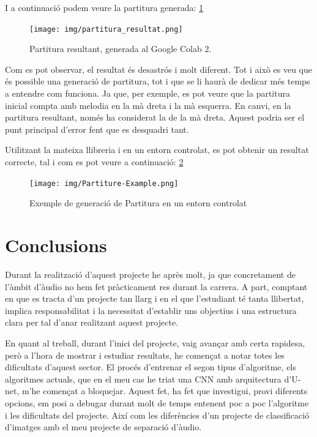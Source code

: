 \documentclass[10pt,a4paper,twocolumn,twoside]{article}
\begin{document}
I a continuació podem veure la partitura generada: \ref{fig:partitura-resultat}
\begin{figure}
    \centering
    \texttt{[image: img/partitura\_resultat.png]}
    \caption{Partitura resultant, generada al Google Colab 2.}
    \label{fig:partitura-resultat}
\end{figure}

Com es pot observar, el resultat és desastrós i molt diferent. Tot i això es veu que és possible una generació de partitura, tot i que se li haurà de dedicar més temps a entendre com funciona. Ja que, per exemple, es pot veure que la partitura inicial compta amb melodia en la mà dreta i la mà esquerra. En canvi, en la partitura resultant, només ha considerat la de la mà dreta. Aquest podria ser el punt principal d'error fent que es desquadri tant.

Utilitzant la mateixa llibreria i en un entorn controlat, es pot obtenir un resultat correcte, tal i com es pot veure a continuació: \ref{fig:partiture-example}
\begin{figure}
    \centering
    \texttt{[image: img/Partiture-Example.png]}
    \caption{Exemple de generació de Partitura en un entorn controlat}
    \label{fig:partiture-example}
\end{figure}

\section{Conclusions}

Durant la realització d'aquest projecte he après molt, ja que concretament de l'àmbit d'àudio no hem fet pràcticament res durant la carrera.
A part, comptant en que es tracta d'un projecte tan llarg i en el que l'estudiant té tanta llibertat, implica responsabilitat i la necessitat d'establir uns objectius i una estructura clara per tal d'anar realitzant aquest projecte.

En quant al treball, durant l'inici del projecte, vaig avançar amb certa rapidesa, però a l'hora de mostrar i estudiar resultats, he començat a notar totes les dificultats d'aquest sector.
El procés d'entrenar el segon tipus d'algoritme, els algoritmes actuals, que en el meu cas he triat una CNN amb arquitectura d'U-net, m'he començat a bloquejar. Aquest fet, ha fet que investigui, provi diferents opcions, em posi a debugar durant molt de temps entenent poc a poc l'algoritme i les dificultats del projecte. Així com les diferències d'un projecte de classificació d'imatges amb el meu projecte de separació d'àudio.
\end{document}
